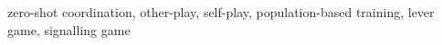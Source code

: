 zero-shot coordination, other-play, self-play, population-based training, lever game, signalling game
